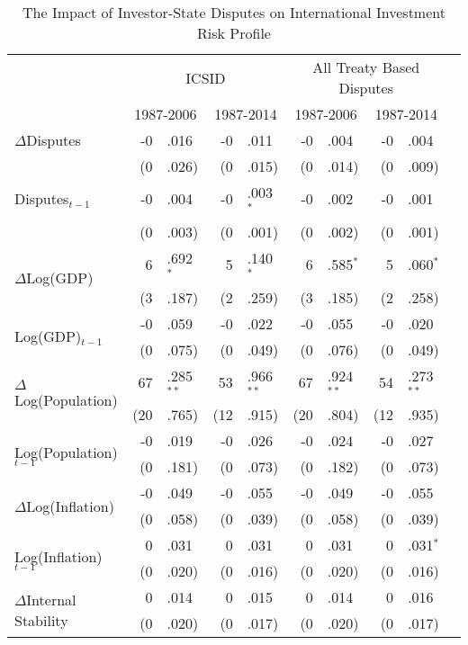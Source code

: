 \documentclass[12pt,onesided]{amsart}
\begin{document}
\begin{table}[ht]
\vspace{1cm}
\centering
{\footnotesize
\caption{The Impact of Investor-State Disputes on International Investment Risk Profile}
\label{tab:ecm}
\begin{tabular}{lr@{} lr@{}lr@{}lr@{}lr@{}}
	\hline\hline
	~ & \multicolumn{4}{c}{ICSID} & \multicolumn{4}{c}{All Treaty Based Disputes} \\
	~ & \multicolumn{2}{c}{1987-2006} & \multicolumn{2}{c}{1987-2014} & \multicolumn{2}{c}{1987-2006} & \multicolumn{2}{c}{1987-2014} \\
	\hline
  $\Delta$Disputes & -0&.016 & -0&.011 & -0&.004 & -0&.004 \\
~ & (0&.026) & (0&.015) & (0&.014) & (0&.009) \\
  Disputes$_{t-1}$ & -0&.004 & -0&.003$^{\ast}$ & -0&.002 & -0&.001 \\
  ~ & (0&.003) &  (0&.001) & (0&.002) & (0&.001) \\
  \multirow{2}{*}{$\Delta$Log(GDP)} & 6&.692$^{\ast}$ & 5&.140$^{\ast}$ & 6&.585$^{\ast}$ & 5&.060$^{\ast}$ \\
  & (3&.187) & (2&.259) & (3&.185) & (2&.258) \\
  \multirow{2}{*}{Log(GDP)$_{t-1}$} & -0&.059 & -0&.022 & -0&.055 & -0&.020\\
  & (0&.075) & (0&.049) & (0&.076) & (0&.049) \\
  \multirow{2}{*}{$\Delta$Log(Population)} & 67&.285$^{\ast\ast}$ & 53&.966$^{\ast\ast}$ & 67&.924$^{\ast\ast}$ & 54&.273$^{\ast\ast}$ \\
  & (20&.765) & (12&.915) & (20&.804) & (12&.935)\\
  \multirow{2}{*}{Log(Population)$_{t-1}$} & -0&.019 & -0&.026 & -0&.024 & -0&.027 \\
  & (0&.181) & (0&.073) & (0&.182) & (0&.073) \\
  \multirow{2}{*}{$\Delta$Log(Inflation)} & -0&.049 &  -0&.055 &  -0&.049 &  -0&.055 \\
  & (0&.058) &  (0&.039) &  (0&.058) &  (0&.039) \\
  \multirow{2}{*}{Log(Inflation)$_{t-1}$} & 0&.031 &  0&.031 &  0&.031 &  0&.031$^{\ast}$ \\
  & (0&.020) &  (0&.016) &  (0&.020) &  (0&.016) \\
  \multirow{2}{*}{$\Delta$Internal Stability} & 0&.014 & 0&.015 &  0&.014 &  0&.016 \\
  & (0&.020) &  (0&.017) &  (0&.020) &  (0&.017) \\

\end{tabular}}
\end{table}
\end{document}

